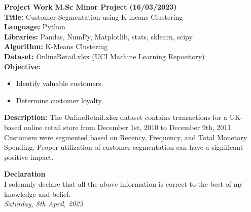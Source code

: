 \documentclass[a4paper,10pt]{article}
\newcommand{\resumeitem}[1]{\item #1}
\begin{document}
\vspace{1cm}

\textbf{Project Work}
\vspace{0.5cm}
\textbf{M.Sc Minor Project (16/03/2023)} \\
\textbf{Title:} Customer Segmentation using K-means Clustering \\
\textbf{Language:} Python \\
\textbf{Libraries:} Pandas, NumPy, Matplotlib, stats, sklearn, scipy \\
\textbf{Algorithm:} K-Means Clustering \\
\textbf{Dataset:} OnlineRetail.xlsx (UCI Machine Learning Repository) \\
\textbf{Objective:}
\begin{itemize}
    \resumeitem{Identify valuable customers.}
    \resumeitem{Determine customer loyalty.}
\end{itemize}
\textbf{Description:} The OnlineRetail.xlsx dataset contains transactions for a UK-based online retail store from December 1st, 2010 to December 9th, 2011. Customers were segmented based on Recency, Frequency, and Total Monetary Spending. Proper utilization of customer segmentation can have a significant positive impact.

\vspace{1cm}

\textbf{Declaration} \\
I solemnly declare that all the above information is correct to the best of my knowledge and belief. \\
\textit{Saturday, 8th April, 2023}
\end{document}
